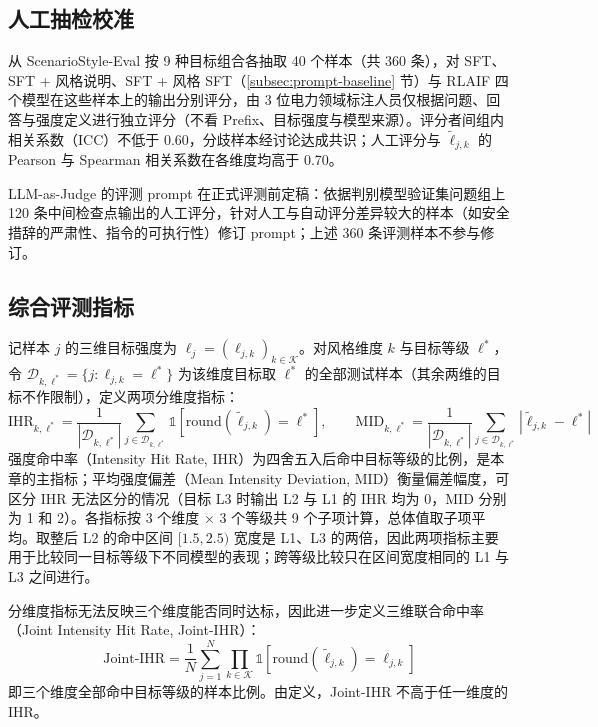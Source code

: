 \documentclass[fontset=fandol,type=master,campus=shenzhen,etitleauto=true]{hithesisbook}
\begin{document}
\subsection{人工抽检校准}\label{ux4ebaux5de5ux62bdux68c0ux6821ux51c6}

从 ScenarioStyle-Eval 按 9 种目标组合各抽取 40 个样本（共 360 条），对 SFT、SFT + 风格说明、SFT + 风格 SFT（\ref{subsec:prompt-baseline} 节）与 RLAIF 四个模型在这些样本上的输出分别评分，由 3 位电力领域标注人员仅根据问题、回答与强度定义进行独立评分（不看 Prefix、目标强度与模型来源）。评分者间组内相关系数（ICC）\cite{ref76}不低于 0.60，分歧样本经讨论达成共识；人工评分与 $\tilde{\ell}_{j,k}$ 的 Pearson 与 Spearman 相关系数在各维度均高于 0.70。

LLM-as-Judge 的评测 prompt 在正式评测前定稿：依据判别模型验证集问题组上 120 条中间检查点输出的人工评分，针对人工与自动评分差异较大的样本（如安全措辞的严肃性、指令的可执行性）修订 prompt；上述 360 条评测样本不参与修订。

\subsection{综合评测指标}\label{ux7efcux5408ux8bc4ux6d4bux6307ux6807}

记样本 $j$ 的三维目标强度为 $\boldsymbol{\ell}_j = (\ell_{j,k})_{k \in \mathcal{K}}$。对风格维度 $k$ 与目标等级 $\ell^*$，令 $\mathcal{D}_{k,\ell^*} = \{ j : \ell_{j,k} = \ell^* \}$ 为该维度目标取 $\ell^*$ 的全部测试样本（其余两维的目标不作限制），定义两项分维度指标：
\begin{equation}
\text{IHR}_{k,\ell^*} = \frac{1}{|\mathcal{D}_{k,\ell^*}|} \sum_{j \in \mathcal{D}_{k,\ell^*}} \mathbb{1}\!\left[\text{round}(\tilde{\ell}_{j,k}) = \ell^*\right], \qquad
\text{MID}_{k,\ell^*} = \frac{1}{|\mathcal{D}_{k,\ell^*}|} \sum_{j \in \mathcal{D}_{k,\ell^*}} \left|\tilde{\ell}_{j,k} - \ell^*\right|
\end{equation}
强度命中率（Intensity Hit Rate, IHR）为四舍五入后命中目标等级的比例，是本章的主指标；平均强度偏差（Mean Intensity Deviation, MID）衡量偏差幅度，可区分 IHR 无法区分的情况（目标 L3 时输出 L2 与 L1 的 IHR 均为 0，MID 分别为 1 和 2）。各指标按 3 个维度 × 3 个等级共 9 个子项计算，总体值取子项平均。取整后 L2 的命中区间 $[1.5, 2.5)$ 宽度是 L1、L3 的两倍，因此两项指标主要用于比较同一目标等级下不同模型的表现；跨等级比较只在区间宽度相同的 L1 与 L3 之间进行。

分维度指标无法反映三个维度能否同时达标，因此进一步定义三维联合命中率（Joint Intensity Hit Rate, Joint-IHR）：
\begin{equation}\label{eq:joint-ihr}
\text{Joint-IHR} = \frac{1}{N} \sum_{j=1}^{N} \prod_{k \in \mathcal{K}} \mathbb{1}\!\left[\text{round}(\tilde{\ell}_{j,k}) = \ell_{j,k}\right]
\end{equation}
即三个维度全部命中目标等级的样本比例。由定义，Joint-IHR 不高于任一维度的 IHR。
\end{document}
